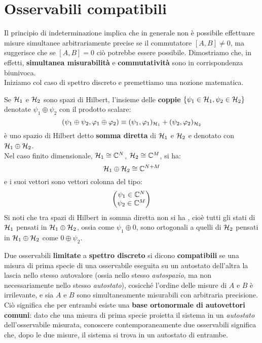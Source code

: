 \documentclass[../../FisicaTeorica.tex]{subfiles}
\begin{document}
\section{Osservabili compatibili}
Il principio di indeterminazione implica che in generale non è possibile effettuare misure simultanee arbitrariamente precise se il commutatore $[A,B]\neq 0$, ma suggerisce che se $[A,B]=0$ ciò potrebbe essere possibile. Dimostriamo che, in effetti, \textbf{simultanea misurabilità} e \textbf{commutatività} sono in corrispondenza biunivoca.\\
Iniziamo col caso di spettro discreto e premettiamo una nozione matematica.\\
\begin{dfn}
Se $\mathcal{H}_1$  e $\mathcal{H}_2$ sono spazi di Hilbert, l'insieme delle \textbf{coppie} $\{\psi_1 \in \mathcal{H}_1, \psi_2 \in \mathcal{H}_2\}$ denotate $\psi_1 \oplus \psi_2$ con il prodotto scalare:
\[
(\psi_1 \oplus \psi_2, \varphi_1 \oplus \varphi_2)\equiv (\psi_1, \varphi_1)_{\mathcal{H}_1} + (\psi_2, \varphi_2)_{\mathcal{H}_2}
\] 
è uno spazio di Hilbert detto \textbf{somma diretta} di $\mathcal{H}_1$ e $\mathcal{H}_2$ e denotato con $\mathcal{H}_1 \oplus \mathcal{H}_2$.\\
Nel caso finito dimensionale, $\mathcal{H}_1 \cong \mathbb{C}^N$, $\mathcal{H}_2 \cong \mathbb{C}^M$, si ha:
\[
\mathcal{H}_1 \oplus \mathcal{H}_2 \cong \mathbb{C}^{N+M}
\]
e i suoi vettori sono vettori colonna del tipo:
\[
\begin{pmatrix}
\psi_1 \in \mathbb{C}^N\\
\psi_2 \in \mathbb{C}^M
\end{pmatrix}
\]
Si noti che tra spazi di Hilbert in somma diretta non si ha , cioè tutti gli stati di $\mathcal{H}_1$ pensati in $\mathcal{H}_1 \oplus \mathcal{H}_2$, ossia come $\psi_1 \oplus 0$, sono ortogonali a quelli di $\mathcal{H}_2$ pensati in $\mathcal{H}_1\oplus \mathcal{H}_2$ come $0\oplus \psi_2$.
\end{dfn}

\begin{dfn}
Due osservabili \textbf{limitate} a \textbf{spettro discreto} si dicono \textbf{compatibili} se una misura di prima specie di una osservabile eseguita su un autostato dell'altra la lascia nello stesso autovalore (ossia nello stesso \textit{autospazio}, ma non necessariamente nello stesso \textit{autostato}), cosicché l'ordine delle misure di $A$ e $B$ è irrilevante, e sia $A$ e $B$ sono simultaneamente misurabili con arbitraria precisione. Ciò significa che per entrambi esiste una \textbf{base ortonormale di autovettori comuni}: dato che una misura di prima specie proietta il sistema in un \textit{autostato} dell'osservabile misurata, conoscere contemporaneamente due osservabili significa che, dopo le due misure, il sistema si trova in un autostato di entrambe.  
\end{dfn}
\end{document}
